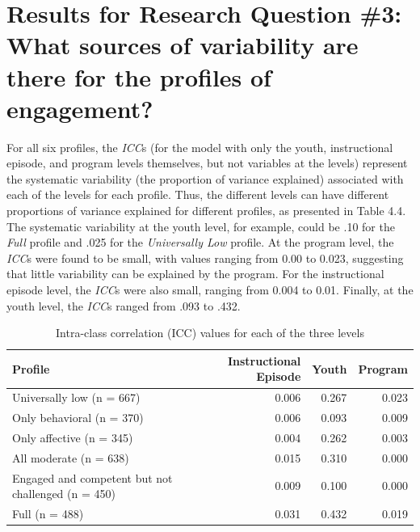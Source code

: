\documentclass[]{book}
\theoremstyle{definition}
\theoremstyle{definition}
\theoremstyle{definition}
\theoremstyle{remark}
\begin{document}
\section{Results for Research Question \#3: What sources of variability
are there for the profiles of
engagement?}\label{results-for-research-question-3-what-sources-of-variability-are-there-for-the-profiles-of-engagement}

For all six profiles, the \emph{ICC}s (for the model with only the
youth, instructional episode, and program levels themselves, but not
variables at the levels) represent the systematic variability (the
proportion of variance explained) associated with each of the levels for
each profile. Thus, the different levels can have different proportions
of variance explained for different profiles, as presented in Table 4.4.
The systematic variability at the youth level, for example, could be .10
for the \emph{Full} profile and .025 for the \emph{Universally Low}
profile. At the program level, the \emph{ICC}s were found to be small,
with values ranging from 0.00 to 0.023, suggesting that little
variability can be explained by the program. For the instructional
episode level, the \emph{ICC}s were also small, ranging from 0.004 to
0.01. Finally, at the youth level, the \emph{ICC}s ranged from .093 to
.432.

\begin{table}

\caption{\label{tab:unnamed-chunk-13}Intra-class correlation (ICC) values for each of the three levels}
\centering
\begin{tabular}[t]{lrrr}
\toprule
Profile & Instructional Episode & Youth & Program\\
\midrule
Universally low (n = 667) & 0.006 & 0.267 & 0.023\\
Only behavioral (n = 370) & 0.006 & 0.093 & 0.009\\
Only affective (n = 345) & 0.004 & 0.262 & 0.003\\
All moderate (n = 638) & 0.015 & 0.310 & 0.000\\
Engaged and competent but not challenged (n = 450) & 0.009 & 0.100 & 0.000\\
Full (n = 488) & 0.031 & 0.432 & 0.019\\
\bottomrule
\end{tabular}
\end{table}
\end{document}
